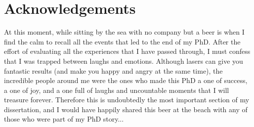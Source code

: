 
\chapter*{Acknowledgements}



At this moment, while sitting by the sea with no company but a beer is when I find the calm to recall all the events that led to the end of my PhD. After the effort of evaluating all the experiences that I have passed through, I must confess that I was trapped between laughs and emotions. Although lasers can give you fantastic results (and make you happy and angry at the same time), the incredible people around me were the ones who made this PhD a one of success, a one of joy, and a one full of laughs and uncountable moments that I will treasure forever. Therefore this is undoubtedly the most important section of my dissertation, and I would have happily shared this beer at the beach with any of those who were part of my PhD story...

\newpage

\cleardoublepage


